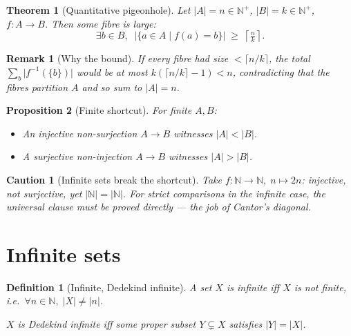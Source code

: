 \documentclass[11pt]{article}
\theoremstyle{defstyle}
\newtheorem{definition}{Definition}[section]
\theoremstyle{thmstyle}
\newtheorem{theorem}{Theorem}[section]
\newtheorem{proposition}[theorem]{Proposition}
\theoremstyle{notstyle}
\newtheorem*{remark}{Remark}
\theoremstyle{cautionstyle}
\newtheorem*{caution}{Caution}
\newcommand{\N}{\mathbb{N}}
\newcommand{\Np}{\mathbb{N}^{+}}
\newcommand{\card}[1]{\lvert #1 \rvert}
\begin{document}
\begin{thmbox}
\begin{theorem}[Quantitative pigeonhole]
Let $\card{A} = n \in \Np$, $\card{B} = k \in \Np$, $f \colon A \to B$.
Then some fibre is large:
\[
  \exists b \in B,\;\; \bigl|\{a \in A \mid f(a) = b\}\bigr|
    \;\geq\; \left\lceil \tfrac{n}{k} \right\rceil.
\]
\end{theorem}
\end{thmbox}

\begin{notebox}
\begin{remark}[Why the bound]
If every fibre had size $< \lceil n/k \rceil$, the total
$\sum_b \card{f^{-1}(\{b\})}$ would be at most
$k(\lceil n/k \rceil - 1) < n$, contradicting that the fibres partition
$A$ and so sum to $\card{A} = n$.
\end{remark}
\end{notebox}

\begin{thmbox}
\begin{proposition}[Finite shortcut]
For \emph{finite} $A, B$:
\begin{itemize}[leftmargin=2em, itemsep=2pt]
  \item An injective non-surjection $A \to B$ witnesses $\card{A} < \card{B}$.
  \item A surjective non-injection $A \to B$ witnesses $\card{A} > \card{B}$.
\end{itemize}
\end{proposition}
\end{thmbox}

\begin{cautionbox}
\begin{caution}[Infinite sets break the shortcut]
Take $f \colon \N \to \N,\; n \mapsto 2n$: injective, not surjective, yet
$\card{\N} = \card{\N}$.  For strict comparisons in the infinite case, the
universal clause must be proved directly --- the job of Cantor's diagonal.
\end{caution}
\end{cautionbox}

\section{Infinite sets}

\begin{defbox}
\begin{definition}[Infinite, Dedekind infinite]
A set $X$ is \emph{infinite} iff $X$ is not finite, i.e.\
$\forall n \in \N,\; \card{X} \neq \card{n}$.

$X$ is \emph{Dedekind infinite} iff some \emph{proper} subset
$Y \subsetneq X$ satisfies $\card{Y} = \card{X}$.
\end{definition}
\end{defbox}
\end{document}
